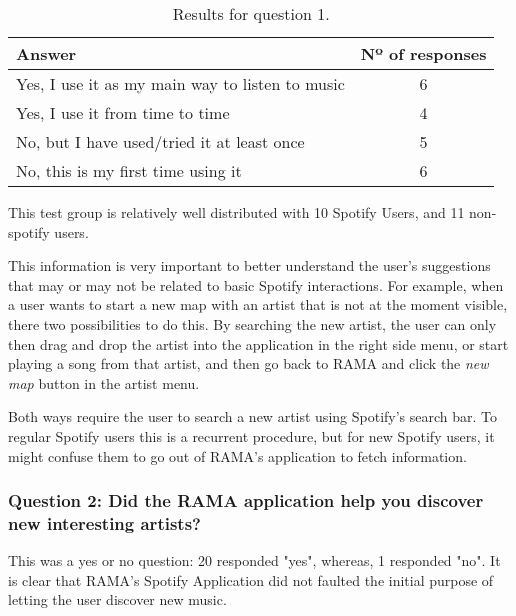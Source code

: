       \begin{table}[H]
         \begin{center}
           \begin{tabular}{l|c}
       
           \hline
           \textbf{Answer} & \textbf{Nº of responses} \\
           \hline

           \hline
              Yes, I use it as my main way to listen to music & 6 \\
              Yes, I use it from time to time & 4 \\
              No, but I have used/tried it at least once & 5 \\
              No, this is my first time using it & 6 \\
           \hline
           \end{tabular}
         \end{center}
         \caption{Results for question 1.}
         \label{tab:question1}
       \end{table}

      This test group is relatively well distributed with 10 Spotify Users, and 11 non-spotify users.

      This information is very important to better understand the user's suggestions that may or may not be related to basic Spotify interactions.
      For example, when a user wants to start a new map with an artist that is not at the moment visible, there two possibilities to do this.
      By searching the new artist, the user can only then drag and drop the artist into the application in the right side menu, or start playing a song from that artist, and then go back to RAMA and click the \emph{new map} button in the artist menu.

      Both ways require the user to search a new artist using Spotify's search bar.
      To regular Spotify users this is a recurrent procedure, but for new Spotify users, it might confuse them to go out of RAMA's application to fetch information.
    
    \subsubsection{Question 2: Did the RAMA application help you discover new interesting artists?}
    \label{ssub:question_2}

      This was a yes or no question: 20 responded "yes", whereas, 1 responded "no".
      It is clear that RAMA's Spotify Application did not faulted the initial purpose of letting the user discover new music.

